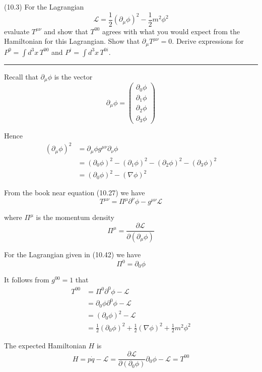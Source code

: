 \documentclass[12pt]{article}
\begin{document}
(10.3)
For the Lagrangian
\begin{equation*}
\mathcal L=\frac{1}{2}(\partial_\mu\phi)^2-\frac{1}{2}m^2\phi^2
\tag{10.42}
\end{equation*}
evaluate $T^{\mu\nu}$ and show that $T^{00}$ agrees with what
you would expect from the Hamiltonian for this Lagrangian.
Show that $\partial_\mu T^{\mu\nu}=0$. Derive expressions
for $P^0=\int d^3x\,T^{00}$ and $P^i=\int d^3x\,T^{0i}$.

\bigskip
\hrule

\bigskip
Recall that $\partial_\mu\phi$ is the vector
\begin{equation*}
\partial_\mu\phi=\begin{pmatrix}
\partial_0\phi
\\
\partial_1\phi
\\
\partial_2\phi
\\
\partial_3\phi
\end{pmatrix}
\end{equation*}

Hence
\begin{align*}
(\partial_\mu\phi)^2
&=\partial_\mu\phi g^{\mu\nu}\partial_\nu\phi
\\
&=(\partial_0\phi)^2-(\partial_1\phi)^2-(\partial_2\phi)^2-(\partial_3\phi)^2
\\
&=(\partial_0\phi)^2-(\nabla\phi)^2
\end{align*}

From the book near equation (10.27) we have
\begin{equation*}
T^{\mu\nu}=\Pi^\mu\partial^\nu\phi-g^{\mu\nu}\mathcal L
\end{equation*}

where $\Pi^\mu$ is the momentum density
\begin{equation*}
\Pi^\mu=\frac{\partial\mathcal L}{\partial(\partial_\mu\phi)}
\end{equation*}

For the Lagrangian given in (10.42) we have
\begin{equation*}
\Pi^0=\partial_0\phi
\end{equation*}

It follows from $g^{00}=1$ that
\begin{align*}
T^{00}
&=\Pi^0\partial^0\phi-\mathcal L
\\
&=\partial_0\phi\partial^0\phi-\mathcal L
\\
&=(\partial_0\phi)^2-\mathcal L
\\
&=\frac{1}{2}(\partial_0\phi)^2+\frac{1}{2}(\nabla\phi)^2+\frac{1}{2}m^2\phi^2
\end{align*}

The expected Hamiltonian $H$ is
\begin{equation*}
H=p\dot q-\mathcal L
=\frac{\partial\mathcal L}{\partial(\partial_0\phi)}\partial_0\phi-\mathcal L
=T^{00}
\end{equation*}
\end{document}
